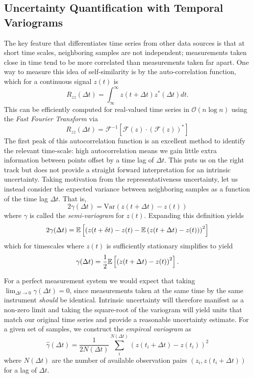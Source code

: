 \subsection{Uncertainty Quantification with Temporal Variograms}

The key feature that differentiates time series from other data sources is that at short time scales, neighboring samples are not independent; measurements taken close in time tend to be more correlated than measurements taken far apart. One way to measure this idea of self-similarity is by the auto-correlation function, which for a continuous signal $z(t)$ is
\begin{equation}
  R_{zz}(\Delta t) = \int_\infty^\infty z(t +\Delta t)z^*(\Delta t)dt.
\end{equation}
This can be efficiently computed for real-valued time series in $\mathcal{O}(n\log n)$ using the \textit{Fast Fourier Transform} via
\begin{equation}
  R_{zz}(\Delta t) = \mathcal{F}^{-1}\left[\mathcal{F}(z)\cdot (\mathcal{F}(z))^*\right]
\end{equation}
The first peak of this autocorrelation function is an excellent method to identify the relevant time-scale: high autocorrelation means we gain little extra information between points offset by a time lag of $\Delta t$. This puts us on the right track but does not provide a straight forward interpretation for an intrinsic uncertainty. Taking motivation from the representativeness uncertainty, let us instead consider the expected variance between neighboring samples as a function of the time lag $\Delta t$. That is,
\begin{equation}
  2\gamma(\Delta t) =  \text{Var}\left(z(t+\Delta t) - z(t)\right)
\end{equation}
where $\gamma$ is called the \textit{semi-variogram} for $z(t)$. Expanding this definition yields
\begin{equation}
  2\gamma(\Delta t) = \mathbb{E}\left[\left(z(t+\delta t) - z(t) - \mathbb{E}\left(z(t+\Delta t) - z(t) \right) \right)^2 \right]
\end{equation}
which for timescales where $z(t)$ is sufficiently stationary simplifies to yield
\begin{equation}
  \gamma(\Delta t) = \frac{1}{2}\mathbb{E}\left[ \left(z(t+\Delta t) - z(t) \right)^2\right].
\end{equation}

For a perfect measurement system we would expect that taking $\lim_{\Delta t \to 0}\gamma(\Delta t) = 0$, since measurements taken at the same time by the same instrument \textit{should} be identical. Intrinsic uncertainty will therefore manifest as a non-zero limit and taking the square-root of the variogram will yield units that match our original time series and provide a reasonable uncertainty estimate. For a given set of samples, we construct the \textit{empircal variogram} as
\begin{equation}
  \hat{\gamma}(\Delta t) = \frac{1}{2N(\Delta t)}\sum_i^{N(\Delta t)}\left(z(t_i + \Delta t) - z(t_i) \right)^2
\end{equation}
where $N(\Delta t)$ are the number of available observation pairs $(z_i, z(t_i+\Delta t))$ for a lag of $\Delta t$.


